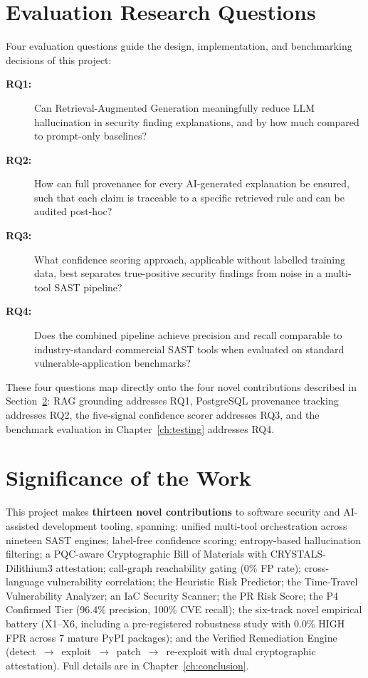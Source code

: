 \section{Evaluation Research Questions}
\label{sec:rqs}

Four evaluation questions guide the design, implementation, and benchmarking decisions of this project:

\begin{description}
  \item[\textbf{RQ1:}] Can Retrieval-Augmented Generation meaningfully reduce LLM hallucination in security finding explanations, and by how much compared to prompt-only baselines?

  \item[\textbf{RQ2:}] How can full provenance for every AI-generated explanation be ensured, such that each claim is traceable to a specific retrieved rule and can be audited post-hoc?

  \item[\textbf{RQ3:}] What confidence scoring approach, applicable without labelled training data, best separates true-positive security findings from noise in a multi-tool SAST pipeline?

  \item[\textbf{RQ4:}] Does the combined \ACRQA{} pipeline achieve precision and recall comparable to industry-standard commercial SAST tools when evaluated on standard vulnerable-application benchmarks?
\end{description}

These four questions map directly onto the four novel contributions described in Section~\ref{sec:significance}: RAG grounding addresses RQ1, PostgreSQL provenance tracking addresses RQ2, the five-signal confidence scorer addresses RQ3, and the benchmark evaluation in Chapter~\ref{ch:testing} addresses RQ4.

\section{Significance of the Work}
\label{sec:significance}

This project makes \textbf{thirteen novel contributions} to software security and AI-assisted development tooling, spanning: unified multi-tool orchestration across nineteen SAST engines; label-free confidence scoring; entropy-based hallucination filtering; a PQC-aware Cryptographic Bill of Materials with CRYSTALS-Dilithium3 attestation; call-graph reachability gating (0\% FP rate); cross-language vulnerability correlation; the Heuristic Risk Predictor; the Time-Travel Vulnerability Analyzer; an IaC Security Scanner; the PR Risk Score; the P4 Confirmed Tier (96.4\% precision, 100\% CVE recall); the six-track novel empirical battery (X1--X6, including a pre-registered robustness study with 0.0\% HIGH FPR across 7 mature PyPI packages); and the Verified Remediation Engine (detect~$\to$~exploit~$\to$~patch~$\to$~re-exploit with dual cryptographic attestation). Full details are in Chapter~\ref{ch:conclusion}.

